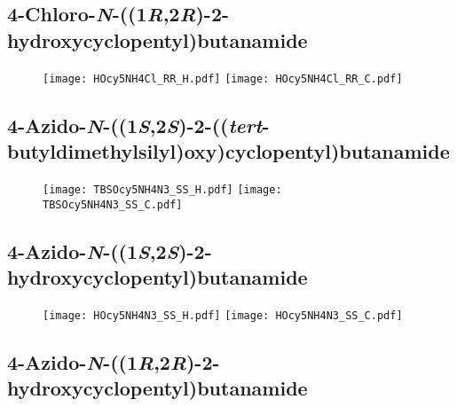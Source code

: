 \subsection{4\hyp{}Chloro\hyp{}\textit{N}\hyp{}((1\textit{R},2\textit{R})\hyp{}2\hyp{}hydroxycyclopentyl)butanamide }

\begin{figure}[H]
	\centering
		\texttt{[image: HOcy5NH4Cl\_RR\_H.pdf]}
		\texttt{[image: HOcy5NH4Cl\_RR\_C.pdf]}
\end{figure}

\subsection{4\hyp{}Azido\hyp{}\textit{N}\hyp{}((1\textit{S},2\textit{S})\hyp{}2\hyp{}((\textit{tert}\hyp{}butyldimethylsilyl)oxy)cyclopentyl)butanamide }

\begin{figure}[H]
	\centering
		\texttt{[image: TBSOcy5NH4N3\_SS\_H.pdf]}
		\texttt{[image: TBSOcy5NH4N3\_SS\_C.pdf]}
\end{figure}

\subsection{4\hyp{}Azido\hyp{}\textit{N}\hyp{}((1\textit{S},2\textit{S})\hyp{}2\hyp{}hydroxycyclopentyl)butanamide }

\begin{figure}[H]
	\centering
		\texttt{[image: HOcy5NH4N3\_SS\_H.pdf]}
		\texttt{[image: HOcy5NH4N3\_SS\_C.pdf]}
\end{figure}

\subsection{4\hyp{}Azido\hyp{}\textit{N}\hyp{}((1\textit{R},2\textit{R})\hyp{}2\hyp{}hydroxycyclopentyl)butanamide } 

